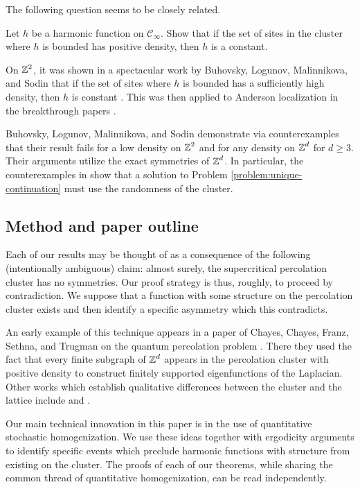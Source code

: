 \documentclass[12pt]{amsart}
\numberwithin{equation}{section}
\begin{document}
	The following question seems to be closely related. 
	\begin{problem} \label{problem:unique-continuation}
		Let $h$ be a harmonic function on $\mathscr{C}_{\infty}$. Show that if the set of sites in the cluster where $h$ is bounded has positive density, then $h$ is a constant. 
	\end{problem}
	On $\operatorname{\mathbb{Z}}^2$, it was shown in a spectacular work by Buhovsky, Logunov, Malinnikova, and Sodin that if the set of sites where $h$ is bounded has a sufficiently 
	high density, then $h$ is constant \cite{blms-harmonic}. This was then applied to Anderson localization in the breakthrough papers 
	\cite{ding-smart-localization, li-zhang-localization}. 
	
	Buhovsky, Logunov, Malinnikova, and Sodin demonstrate via counterexamples that their result fails for a low density on $\operatorname{\mathbb{Z}}^2$ and for any density on $\operatorname{\mathbb{Z}}^d$ for $d \geq 3$.  Their arguments utilize the exact symmetries of $\operatorname{\mathbb{Z}}^d$. In particular, the counterexamples in \cite{blms-harmonic} show that a solution to Problem \ref{problem:unique-continuation} must use the randomness of the cluster. 
	
	
	
	
	\subsection{Method and paper outline}
	Each of our results may be thought of as a consequence of the following (intentionally ambiguous) claim: almost surely, the supercritical percolation cluster has no symmetries. Our proof strategy is thus, roughly, to proceed by contradiction. We suppose that a function with some structure on the percolation cluster exists and then identify a specific asymmetry which this contradicts. 
	
	An early example of this technique appears in a paper of Chayes, Chayes, Franz, Sethna, and Trugman on the quantum percolation problem \cite{chayes-quantum-percolation}.
	There they used the fact that every finite subgraph of $\operatorname{\mathbb{Z}}^d$ appears in the percolation cluster with positive density to construct finitely supported eigenfunctions of the Laplacian. 
	Other works which establish qualitative differences between the cluster and the lattice include  \cite{fastmixing-ising} and \cite{effective-resistance-percolation-cluster}.
	
	
	Our main technical innovation in this paper is in the use of quantitative stochastic homogenization. We use these ideas together with ergodicity arguments to identify specific events which preclude harmonic functions with structure from existing on the cluster. The proofs of each of our theorems, while sharing the common thread of quantitative homogenization, can be read independently.
	
\end{document}
